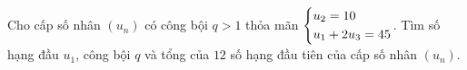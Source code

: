 \begin{bt}%
	Cho cấp số nhân $(u_n)$ có công bội $q>1$ thỏa mãn $\left\{\begin{aligned}&u_2=10\\&u_1+2u_3=45\end{aligned}\right.$.
	Tìm số hạng đầu $u_1$, công bội $q$ và tổng của $12$ số hạng đầu tiên của cấp số nhân $(u_n)$.
\end{bt}

